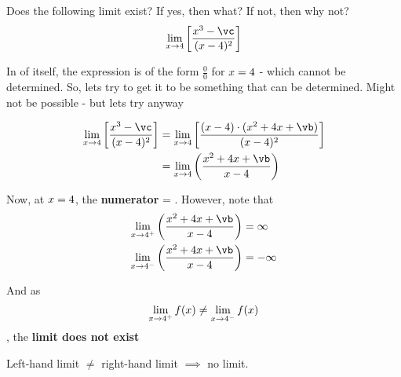 

\SQUARE\va\vb
\POWER{}\vc
\MULTIPLY{}\vd

\question[4] Does the following limit exist? If yes, then what? If not, then why not?
\[ \lim_{x\to\va}\left[ \dfrac{x^3-\vc}{(x-\va)^2}\right]\]

\watchout[-40pt]

\begin{solution}[\halfpage]
  In of itself, the expression is of the form $\frac{0}{0}$ for $x=4$ - which cannot be determined. So, lets try to get it to be something that can be determined. Might not be possible - but lets try anyway
  
  \begin{align}
    \lim_{x\to\va}\left[ \dfrac{x^3-\vc}{(x-\va)^2}\right] &= 
    \lim_{x\to\va}\left[ \dfrac{(x-\va)\cdot (x^2 + \va x + \vb)}{(x-\va)^2}\right]\\
    &= \lim_{x\to\va}\left( \dfrac{x^2+\va x + \vb}{x-\va}\right)
  \end{align}
  
  Now, at $x=4$, the \textbf{numerator} = \vd. However, note that 
  \begin{align}
    \lim_{x\to\va^+}\left( \dfrac{x^2+\va x + \vb}{x-\va}\right) &= \infty \\
    \lim_{x\to\va^-}\left( \dfrac{x^2+\va x + \vb}{x-\va}\right) &= -\infty
  \end{align}
  
  And as \[ \lim_{x\to4^+} f(x) \neq \lim_{x\to4^-} f(x)\], the \textbf{limit does not exist}
\end{solution}
\ifprintanswers\begin{codex}
  Left-hand limit $\neq$ right-hand limit $\implies$ no limit.
\end{codex}\fi
